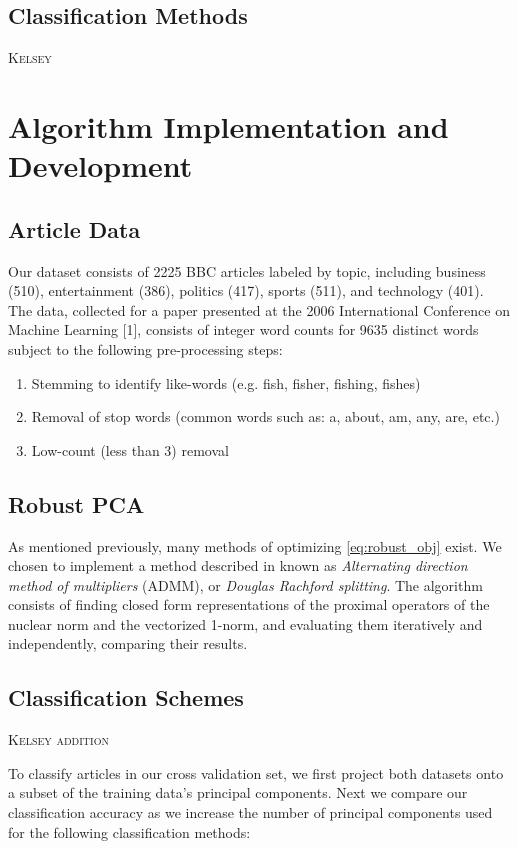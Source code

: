 \documentclass[12pt]{article}
\newcommand{\comment}[1]{\textsc{\color[rgb]{1,0,0}#1}}
\begin{document}
\subsection{Classification Methods}
\comment{Kelsey}
\section{Algorithm Implementation and Development}

\subsection{Article Data}

Our dataset consists of 2225 BBC articles labeled by topic, including business (510), entertainment (386), politics (417), sports (511), and technology (401). The data, collected for a paper presented at the 2006 International Conference on Machine Learning [1], consists of integer word counts for 9635 distinct words subject to the following pre-processing steps:
\begin{enumerate}
\item Stemming to identify like-words (e.g. fish, fisher, fishing, fishes)
\item Removal of stop words (common words such as: a, about, am, any, are, etc.)
\item Low-count (less than 3) removal
\end{enumerate}

\subsection{Robust PCA}
As mentioned previously, many methods of optimizing \eqref{eq:robust_obj} exist. We chosen to implement a method described in \cite{prox} known as \emph{Alternating direction method of multipliers} (ADMM), or \emph{Douglas Rachford splitting}. The algorithm consists of finding closed form representations of the proximal operators of the nuclear norm and the vectorized 1-norm, and evaluating them iteratively and independently, comparing their results.  

\subsection{Classification Schemes}
\comment{Kelsey addition}

To classify articles in our cross validation set, we first project both datasets onto a subset of the training data’s principal components. Next we compare our classification accuracy as we increase the number of principal components used for the following classification methods:
\end{document}
